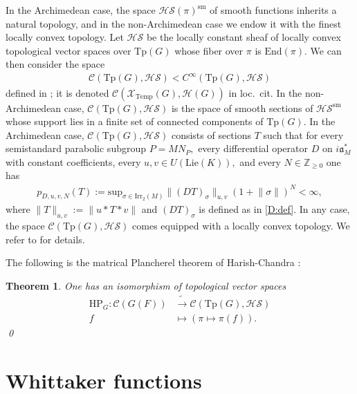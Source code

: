 \documentclass[12pt]{amsart}
\newtheorem{thm}{Theorem}[section]
\theoremstyle{remark}
\numberwithin{equation}{section}
\newcommand{\ZZ}{\mathbb{Z}}
\newcommand{\lto}{\longrightarrow}
\theoremstyle{definition}
\numberwithin{equation}{subsection}
\newcommand{\norm}[1]{\lVert#1\rVert}
\begin{document}
In the Archimedean case, the space $\mathcal{HS}(\pi)^{\mathrm{sm}}$ of smooth functions inherits a natural topology, and in the non-Archimedean case we endow it with the finest locally convex topology. Let  $\mathcal{HS}$ be the locally constant sheaf of locally convex topological vector spaces over $\mathrm{Tp}(G)$ whose fiber over $\pi$ is $\mathrm{End}(\pi).$
We can then consider the space
\begin{align*}
    \mathcal{C}(\mathrm{Tp}(G),\mathcal{HS}) <C^\infty(\mathrm{Tp}(G),\mathcal{HS})
\end{align*}
defined in \cite[\S 2.6]{BP:Ast}; it is denoted $\mathcal{C}(\mathcal{X}_{\mathrm{Temp}}(G),\mathcal{H}(G))$ in loc.~cit.  
In the non-Archimedean case, $\mathcal{C}(\mathrm{Tp}(G),\mathcal{HS})$ is the space of smooth sections of $\mathcal{HS}^{\mathrm{sm}}$ whose support lies in a finite set of connected components of $\mathrm{Tp}(G).$  In the Archimedean case, $\mathcal{C}(\mathrm{Tp}(G),\mathcal{HS})$ consists of sections $T$ such that for every semistandard parabolic subgroup $P=MN_P,$ every differential operator $D$ on $i\mathfrak{a}_M^\ast$ with constant coefficients, every $u,v \in U(\mathrm{Lie}(K)),$ and every $N \in \ZZ_{\geq 0}$ one has
\begin{align*} 
p_{D,u,v,N}(T):=\mathrm{sup}_{\sigma \in \mathrm{Irr}_2(M)}\norm{(DT)_{\sigma}}_{u,v  }(1+\norm{\sigma})^N<\infty,
\end{align*}
where $\norm{T}_{u,v}:=\norm{u\ast T\ast v}$ and $(DT)_\sigma$ is defined as in \eqref{D:def}. In any case, the space $\mathcal{C}(\mathrm{Tp}(G),\mathcal{HS})$ comes equipped with a locally convex topology. We refer to \cite[\S 2.6]{BP:Ast} for details.  



The following is the matrical Plancherel theorem of Harish-Chandra \cite[Theorem 2.6.1]{BP:Ast}:

\begin{thm} \label{thm:HC}
One has an isomorphism of topological vector spaces 
\begin{align*}
 \mathrm{HP}_G: \mathcal{C}(G(F)) &\tilde{\lto}  \mathcal{C}(\mathrm{Tp}(G),\mathcal{HS})\\
 f &\longmapsto (\pi \mapsto \pi(f)).
\end{align*}\qed
\end{thm}


\section{Whittaker functions} \label{sec:gen}
\end{document}
